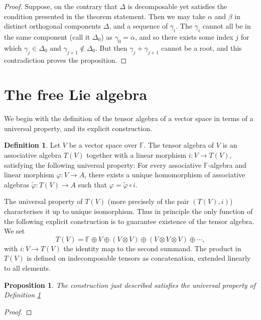 \documentclass[12pt]{article}
\theoremstyle{plain}
\newtheorem{prop}[thm]{Proposition}
\theoremstyle{definition}
\newtheorem{defn}{Definition}[section]
\numberwithin{equation}{section}
\newcommand{\al}{\alpha}
\newcommand{\D}{\Delta}
\newcommand{\F}{\mathbb{F}}
\begin{document}
\begin{proof}
Suppose, on the contrary that $\D$ is decomposable yet satisfies the condition presented in the theorem statement. Then we may take $\al$ and $\beta$ in distinct orthogonal components $\D$, and a sequence of $\gamma_i$. The $\gamma_i$ cannot all be in the same component (call it $\D_0$) as $\gamma_0 = \al$, and so there exists some index $j$ for which $\gamma_j \in \D_0$ and $\gamma_{j+1} \notin \D_0$. But then $\gamma_j + \gamma_{j+1}$ cannot be a root, and this contradiction proves the proposition.
\end{proof}

\section{The free Lie algebra}

We begin with the definition of the tensor algebra of a vector space in terms of a universal property, and its explicit construction.
\begin{defn}\label{defn:T(V).univ}
Let $V$ be a vector space over $\F$. The tensor algebra of $V$ is an associative algebra $T(V)$ together with a linear morphism $i : V \rightarrow T(V)$, satisfying the following universal property: For every associative $\F$-algebra and linear morphism $\varphi : V \rightarrow A$, there exists a unique homomorphism of associative algebras $\widetilde\varphi : T(V) \rightarrow A$ such that $\varphi = \widetilde\varphi \circ i$.
\end{defn}
The universal property of $T(V)$ (more precisely of the pair $(T(V), i)$) characterises it up to unique isomorphism. Thus in principle the only function of the following explicit construction is to guarantee existence of the tensor algebra. We set
\[
T(V) = \F \oplus V \oplus (V \otimes V) \oplus (V \otimes V \otimes V) \oplus  \cdots,
\]
with $i : V \rightarrow T(V)$ the identity map to the second summand. The product in $T(V)$ is defined on indecomposable tensors as concatenation, extended linearly to all elements.
\begin{prop}
The construction just described satisfies the universal property of Definition \ref{defn:T(V).univ}
\end{prop}

\begin{proof}

\end{proof}
\end{document}
